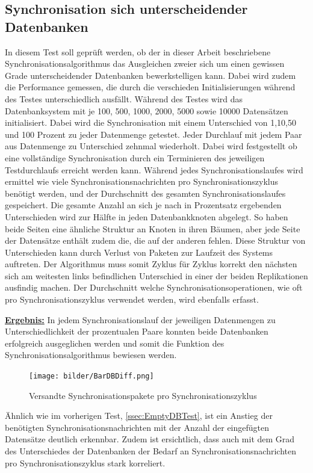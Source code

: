 \documentclass[a4paper,11pt,oneside,%
headsepline,												%
footsepline,												%
bibtotocnumbered									%
]{scrreprt}
\begin{document}
\subsection{Synchronisation sich unterscheidender Datenbanken}
\label{ssec:DiffThroughLost}
In diesem Test soll geprüft werden, ob der in dieser Arbeit beschriebene Synchronisationsalgorithmus das Ausgleichen zweier sich um einen gewissen Grade unterscheidender Datenbanken bewerkstelligen kann. Dabei wird zudem die Performance gemessen, die durch die verschieden Initialisierungen während des Testes unterschiedlich ausfällt. Während des Testes wird das Datenbanksystem mit je 100, 500, 1000, 2000, 5000 sowie 10000 Datensätzen initialisiert. Dabei wird die Synchronisation mit einem Unterschied von 1,10,50 und 100 Prozent zu jeder Datenmenge getestet. Jeder Durchlauf mit jedem Paar aus Datenmenge zu Unterschied zehnmal wiederholt. Dabei wird festgestellt ob eine vollständige Synchronisation durch ein Terminieren des jeweiligen Testdurchlaufs erreicht werden kann. Während jedes Synchronisationslaufes wird ermittel wie viele Synchronisationsnachrichten pro Synchronisationszyklus benötigt werden, und der Durchschnitt des gesamten Synchronisationslaufes gespeichert. Die gesamte Anzahl an sich je nach in Prozentsatz ergebenden Unterschieden wird zur Hälfte in jeden Datenbankknoten abgelegt. So haben beide Seiten eine ähnliche Struktur an Knoten in ihren Bäumen, aber jede Seite der Datensätze enthält zudem die, die auf der anderen fehlen. Diese Struktur von Unterschieden kann durch Verlust von Paketen zur Laufzeit des Systems auftreten. Der Algorithmus muss somit Zyklus für Zyklus korrekt den nächsten sich am weitesten links befindlichen Unterschied in einer der beiden Replikationen ausfindig machen. Der Durchschnitt welche Synchronisationsoperationen, wie oft pro Synchronisationszyklus verwendet werden, wird ebenfalls erfasst.

\underline{{\bf Ergebnis:}} In jedem Synchronisationslauf der jeweiligen Datenmengen zu Unterschiedlichkeit der prozentualen Paare konnten beide Datenbanken erfolgreich ausgeglichen werden und somit die Funktion des Synchronisationsalgorithmus bewiesen werden.
\begin{figure}[h!]
  \begin{center}
    \texttt{[image: bilder/BarDBDiff.png]}
  \end{center}
 \caption{Versandte Synchronisationspakete pro Synchronisationszyklus}
  \label{fig:EmptyDiffTraffic}
\end{figure}
 Ähnlich wie im vorherigen Test, \autoref{ssec:EmptyDBTest}, ist ein Anstieg der benötigten Synchronisationsnachrichten mit der Anzahl der eingefügten Datensätze deutlich erkennbar. Zudem ist ersichtlich, dass auch mit dem Grad des Unterschiedes der Datenbanken der Bedarf an Synchronisationsnachrichten pro Synchronisationszyklus stark korreliert. 
\end{document}
